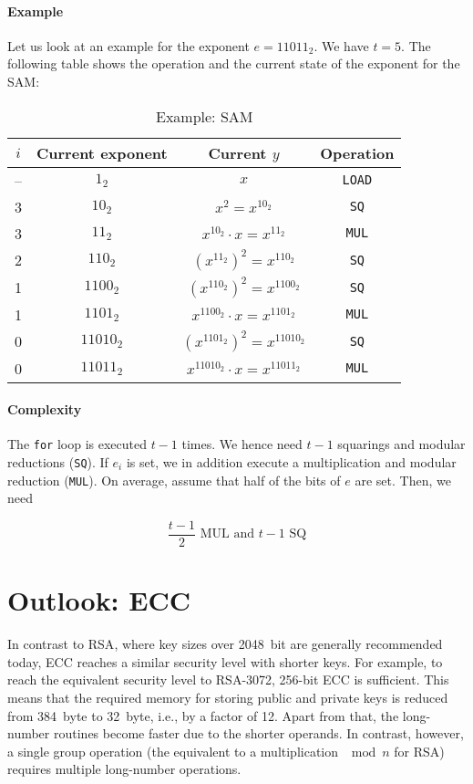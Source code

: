 \paragraph{Example}
Let us look at an example for the exponent $e = 11011_2$. We have $t = 5$. The following table shows the operation and the current state of the exponent for the \ac{SAM}:

\begin{table}[htbp]
	\centering
		\begin{tabular}{c | c | c | c }
			  $i$ & Current exponent & Current $y$ & Operation \\ \hline
			  -- & $1_2$   & $x$ & \verb+LOAD+ \\
			  3  &  $10_2$ & $x^2 = x ^{10_2}$ & \verb+SQ+ \\
			  3  &  $11_2$ & $x^{10_2} \cdot x = x^{11_2}$ & \verb+MUL+ \\
			  2 &  $110_2$ & $\left(x^{11_2}\right)^2 = x^{110_2}$ & \verb+SQ+ \\
			  1 &  $1100_2$ & $\left(x^{110_2}\right)^2 = x^{1100_2}$ & \verb+SQ+ \\
			  1 &  $1101_2$ & $x^{1100_2} \cdot x = x^{1101_2}$ & \verb+MUL+ \\
			  0 &  $11010_2$ & $\left(x^{1101_2}\right)^2 = x^{11010_2}$ & \verb+SQ+ \\
			  0 &  $11011_2$ & $x^{11010_2} \cdot x = x^{11011_2}$ & \verb+MUL+
		\end{tabular}
	\caption{Example: \ac{SAM}}
	\label{tab:asymmetric_crypto:example_sam}
\end{table}


\paragraph{Complexity}
The \verb+for+ loop is executed $t-1$ times. We hence need $t-1$ squarings and modular reductions (\verb+SQ+). If $e_i$ is set, we in addition execute a multiplication and modular reduction (\verb+MUL+). On average, assume that half of the bits of $e$ are set. Then, we need

$$\frac{t-1}{2} \mbox{ MUL and } t-1 \mbox{ SQ}$$

\section{Outlook: \acl{ECC}}
\label{sec:asymmetric_crypto:ecc}
In contrast to \ac{RSA}, where key sizes over 2048~bit are generally recommended today, \acl{ECC} reaches a similar security level with shorter keys. For example, to reach the equivalent security level to \ac{RSA}-3072, 256-bit \ac{ECC} is sufficient. This means that the required memory for storing public and private keys is reduced from 384~byte to 32~byte, i.e., by a factor of 12. Apart from that, the long-number routines become faster due to the shorter operands. In contrast, however, a single group operation (the equivalent to a multiplication $\mod n$ for \ac{RSA}) requires multiple long-number operations. 

